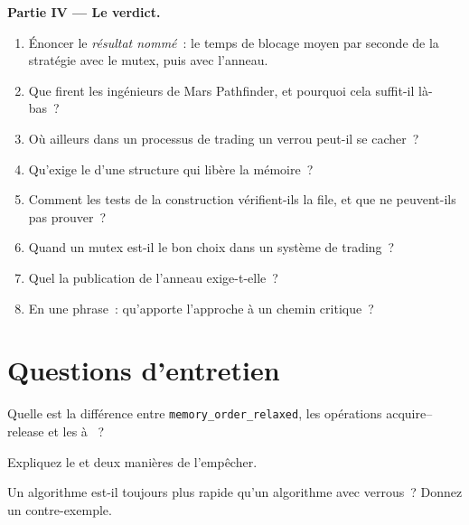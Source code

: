 \begin{problem}
\medskip\noindent\textbf{Partie IV --- Le verdict.}
\begin{enumerate}[resume]
\item Énoncer le \emph{résultat nommé}~: le temps de blocage moyen par seconde de la stratégie avec le mutex, puis avec l'anneau.
\item Que firent les ingénieurs de Mars Pathfinder, et pourquoi cela suffit-il là-bas~?
\item Où ailleurs dans un processus de trading un verrou peut-il se cacher~?
\item Qu'exige le  d'une structure  qui libère la mémoire~?
\item Comment les tests de la construction vérifient-ils la file, et que ne peuvent-ils pas prouver~?
\item Quand un mutex est-il le bon choix dans un système de trading~?
\item Quel  la publication de l'anneau exige-t-elle~?
\item En une phrase~: qu'apporte l'approche  à un chemin critique~?
\end{enumerate}
\end{problem}

\section{Questions d'entretien}

\begin{interviewq}\label{iq:ll:lock-free-programming:1}
Quelle est la différence entre \texttt{memory\_order\_relaxed}, les opérations acquire--release et les  à ~?
\end{interviewq}

\begin{interviewq}\label{iq:ll:lock-free-programming:2}
Expliquez le  et deux manières de l'empêcher.
\end{interviewq}

\begin{interviewq}\label{iq:ll:lock-free-programming:3}
Un algorithme  est-il toujours plus rapide qu'un algorithme avec verrous~? Donnez un contre-exemple.
\end{interviewq}

